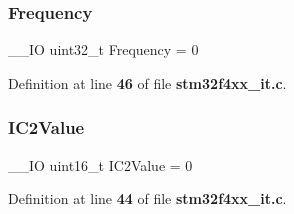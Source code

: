 \subsubsection{Frequency}
{\footnotesize\ttfamily \+\_\+\+\_\+\+IO uint32\+\_\+t Frequency = 0}



Definition at line \textbf{ 46} of file \textbf{ stm32f4xx\+\_\+it.\+c}.

\mbox{\label{group__TIM__PWM__Input_gabd99ab05d2b4fa0a6cdda7f7025f1c0f}} 
\subsubsection{I\+C2\+Value}
{\footnotesize\ttfamily \+\_\+\+\_\+\+IO uint16\+\_\+t I\+C2\+Value = 0}



Definition at line \textbf{ 44} of file \textbf{ stm32f4xx\+\_\+it.\+c}.

